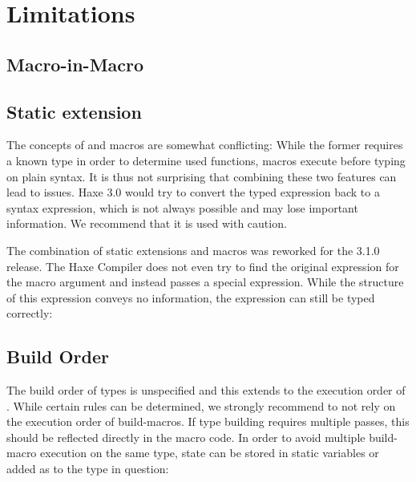 \section{Limitations}
\label{macro-limitations}

\subsection{Macro-in-Macro}
\label{macro-limitations-macro-in-macro}

\subsection{Static extension}
\label{macro-limitations-static-extension}

The concepts of  and macros are somewhat conflicting: While the former requires a known type in order to determine used functions, macros execute before typing on plain syntax. It is thus not surprising that combining these two features can lead to issues. Haxe 3.0 would try to convert the typed expression back to a syntax expression, which is not always possible and may lose important information. We recommend that it is used with caution.


The combination of static extensions and macros was reworked for the 3.1.0 release. The Haxe Compiler does not even try to find the original expression for the macro argument and instead passes a special  expression. While the structure of this expression conveys no information, the expression can still be typed correctly:




\subsection{Build Order}
\label{macro-limitations-build-order}

The build order of types is unspecified and this extends to the execution order of . While certain rules can be determined, we strongly recommend to not rely on the execution order of build-macros. If type building requires multiple passes, this should be reflected directly in the macro code. In order to avoid multiple build-macro execution on the same type, state can be stored in static variables or added as  to the type in question:

